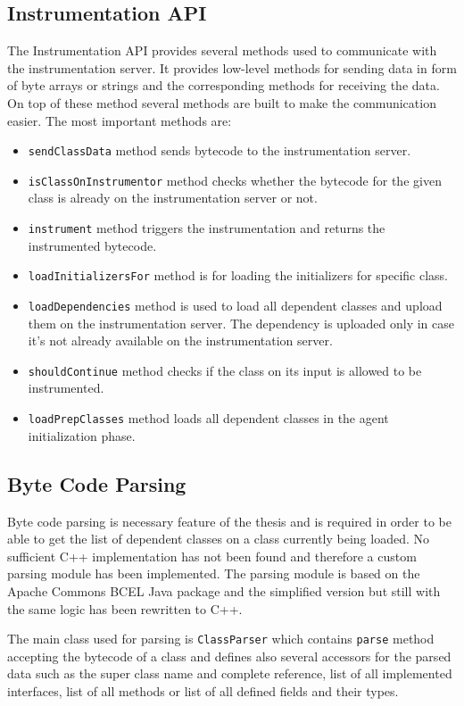 \subsection{Instrumentation API}
The Instrumentation API provides several methods used to communicate with the instrumentation server. It provides low-level methods for sending data in form of byte arrays or strings and the corresponding methods for receiving the data. On top of these method several methods are built to make the communication easier. The most important methods are:
\begin{itemize}
	\item \texttt{sendClassData} method sends bytecode to the instrumentation server.
	\item \texttt{isClassOnInstrumentor} method checks whether the bytecode for the given class is already on the instrumentation server or not.
	\item \texttt{instrument} method triggers the instrumentation and returns the instrumented bytecode.
	\item \texttt{loadInitializersFor} method is for loading the initializers for specific class.
	\item \texttt{loadDependencies} method is used to load all dependent classes and upload them on the instrumentation server. The dependency is uploaded only in case it's not already available on the instrumentation server.
	\item \texttt{shouldContinue} method checks if the class on its input is allowed to be instrumented.
	\item \texttt{loadPrepClasses} method loads all dependent classes in the agent initialization phase.
\end{itemize}

\subsection{Byte Code Parsing}
\label{imp:parsing}
Byte code parsing is necessary feature of the thesis and is required in order to be able to get the list of dependent classes on a class currently being loaded. No sufficient C++ implementation has not been found and therefore a custom parsing module has been implemented. The parsing module is based on the Apache Commons BCEL Java package and the simplified version but still with the same logic has been rewritten to C++.

The main class used for parsing is \texttt{ClassParser} which contains \texttt{parse} method accepting the bytecode of a class and defines also several accessors  for the parsed data such as the super class name and complete reference, list of all implemented interfaces, list of all methods or list of all defined fields and their types.


